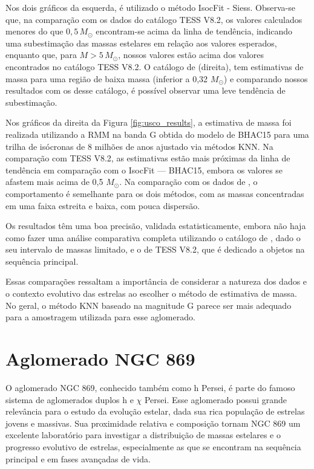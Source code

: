 	Nos dois gráficos da esquerda, é utilizado o método IsocFit - Siess. Observa-se que, na comparação com os dados do catálogo TESS V8.2, os valores calculados menores do que \(0,5 \, M_\odot\) encontram-se acima da linha de tendência, indicando uma subestimação das massas estelares em relação aos valores esperados, enquanto que, para \(M > 5 \, M_\odot\), nossos valores estão acima dos valores encontrados no catálogo TESS V8.2. O catálogo de  (direita), tem estimativas de massa para uma região de baixa massa (inferior a 0,32 \(M_\odot\)) e comparando nossos resultados com os desse catálogo, é possível observar uma leve tendência de subestimação.
	
	Nos gráficos da direita da Figura \ref{fig:usco_results}, a estimativa de massa foi realizada utilizando a RMM na banda G obtida do modelo de BHAC15 para uma trilha de isócronas de 8 milhões de anos ajustado via métodos KNN. Na comparação com TESS V8.2, as estimativas estão mais próximas da linha de tendência em comparação com o IsocFit — BHAC15, embora os valores se afastem mais acima de 0,5 \(M_\odot\). Na comparação com os dados de , o comportamento é semelhante para os dois métodos, com as massas concentradas em uma faixa estreita e baixa, com pouca dispersão.
	
		
	
	Os resultados têm uma boa precisão, validada estatisticamente, embora não haja como fazer uma análise comparativa completa utilizando o catálogo de , dado o seu intervalo de massas limitado, e o de TESS V8.2, que é dedicado a objetos na sequência principal.
	
	
	Essas comparações ressaltam a importância de considerar a natureza dos dados e o contexto evolutivo das estrelas ao escolher o método de estimativa de massa. No geral, o método KNN baseado na magnitude G parece ser mais adequado para a amostragem utilizada para esse aglomerado.
	
	\section{Aglomerado NGC 869}\label{sec:hper}
	
	O aglomerado NGC 869, conhecido também como h Persei, é parte do famoso sistema de aglomerados duplos h e \(\chi\) Persei. Esse aglomerado possui grande relevância para o estudo da evolução estelar, dada sua rica população de estrelas jovens e massivas. Sua proximidade relativa e composição tornam NGC 869 um excelente laboratório para investigar a distribuição de massas estelares e o progresso evolutivo de estrelas, especialmente as que se encontram na sequência principal e em fases avançadas de vida.
	
